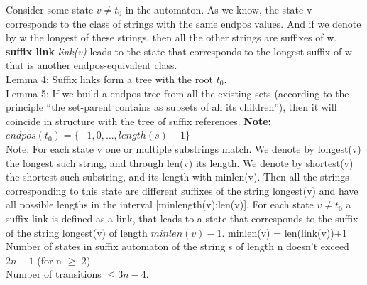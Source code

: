 \documentclass[8pt, a4paper, oneside, twocolumn]{extarticle}
\begin{document}
Consider some state $v \neq t_0$ in the automaton. As we know, the state v corresponds to the class of strings with the same endpos values. And if we denote by w the longest of these strings, then all the other strings are suffixes of w. \textbf{suffix link} \textit{link(v)} leads to the state that corresponds to the longest suffix of w that is another endpos-equivalent class.\\
Lemma 4: Suffix links form a tree with the root $t_0$.\\
Lemma 5: If we build a endpos tree from all the existing sets (according to the principle “the set-parent contains as subsets of all its children”), then it will coincide in structure with the tree of suffix references. \textbf{Note: }$endpos(t_0) = \{-1, 0, \dots, length(s)-1\}$\\
Note: For each state v one or multiple substrings match. We denote by longest(v) the longest such string, and through len(v) its length. We denote by shortest(v) the shortest such substring, and its length with minlen(v). Then all the strings corresponding to this state are different suffixes of the string longest(v) and have all possible lengths in the interval [minlength(v);len(v)]. For each state $v \neq t_0$ a suffix link is defined as a link, that leads to a state that corresponds to the suffix of the string longest(v) of length $minlen(v) - 1$. minlen(v) = len(link(v))+1 \\
Number of states in suffix automaton of the string s of length n doesn't exceed $2n - 1$ (for n $\geq$ 2)\\
Number of transitions $\leq 3n - 4$.
\end{document}
